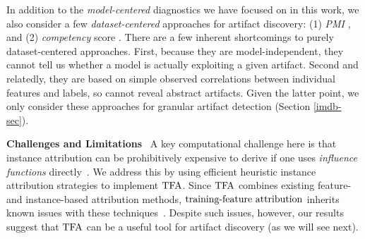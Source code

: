 \documentclass[11pt]{article}
\newcommand\para[1]{\vskip 1mm\noindent\textbf{#1}~}
\begin{document}
In addition to the \emph{model-centered} diagnostics we have focused on in this work, we also consider a few \emph{dataset-centered} approaches for artifact discovery:
(1) \textit{PMI} \citep{gururangan2018annotation}, and (2) \textit{competency} score \citep{gardner2021competency}. 
There are a few inherent shortcomings to purely dataset-centered approaches.
First, because they are model-independent, they cannot tell us whether a model is actually exploiting a given artifact.
Second and relatedly, they are based on simple observed correlations between individual features and labels, so cannot reveal abstract artifacts.
Given the latter point, we only consider these approaches for granular artifact detection (Section \ref{imdb-sec}).  

\para{Challenges and Limitations}
A key computational challenge here is that instance attribution can be prohibitively expensive to derive if one uses \emph{influence functions} directly~\cite{koh2017understanding,han2020explaining}.
We address this by using efficient heuristic instance attribution strategies \citep{pezeshkpour2021empirical} to implement $\text{TFA}$.
Since $\text{TFA}$ combines existing feature- and instance-based attribution methods, $\text{training-feature attribution}$ inherits known issues with these techniques~\citep{kindermans2019reliability,basu2020influence}.
Despite such issues, however, our results suggest that $\text{TFA}$ can be a useful tool for artifact discovery (as we will see next).
\end{document}
